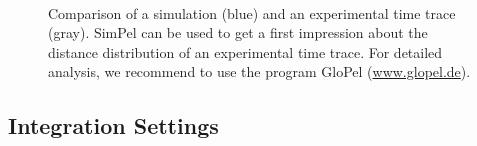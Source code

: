 \documentclass[pdftex,bezier,german,a4,twoside, headexclude,12pt,nochapterprefix, titlepage]{extarticle}
\newcommand{\simpel}{\textsf{SimPel}}
\newcommand{\figspace}{\hspace{0.5cm}}
\begin{document}
\begin{figure}[!htb]
\centering
     \figspace
      \\[-0.3cm]
    \caption{Comparison of a simulation (blue) and an experimental time trace (gray). \simpel{} can be used to get a first impression about the distance distribution of an experimental time trace. For detailed analysis, we recommend to use the program GloPel (\url{www.glopel.de}).
    }
\label{Expample_experimental_dataset}
\end{figure}

\clearpage

\subsection{Integration Settings}
\end{document}
